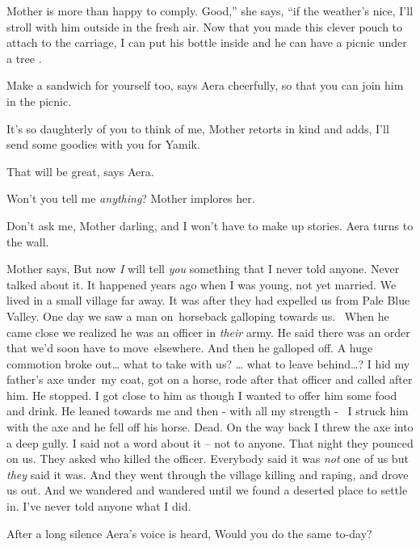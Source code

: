 \documentclass[12pt]{book}
\begin{document}
Mother is more than happy to comply. {\textquotedbl}Good,'' she says, ``if the weather's nice, I'll stroll with him
outside in the fresh air. Now that you made this clever pouch to attach to the carriage, I can put his bottle inside
and he can have a picnic under a tree .{\textquotedbl}

{\textquotedbl}Make a sandwich for yourself too,{\textquotedbl} says Aera cheerfully, {\textquotedbl}so that you can
join him in the picnic.{\textquotedbl}

{\textquotedbl}It's so daughterly of you to think of me,{\textquotedbl} Mother retorts in kind and adds,
{\textquotedbl}I'll send some goodies with you for Yamik.{\textquotedbl}

{\textquotedbl}That will be great,{\textquotedbl} says Aera.

{\textquotedbl}Won't you tell me \textit{anything}?{\textquotedbl} Mother implores her.

{\textquotedbl}Don't ask me, Mother darling, and I won't have to make up stories.{\textquotedbl} Aera turns to the wall.

Mother says, {\textquotedbl}But now \textit{I }will tell \textit{you} something that I never told anyone. Never talked
about it. It happened years ago when I was young, not yet married. We lived in a small village far away. It was after
they had expelled us from Pale Blue Valley. One day we saw a man on~horseback galloping towards us. ~When he came close
we realized he was an officer in \textit{their} army. He said there was an order that we'd soon have to move~elsewhere.
And then he galloped off. A huge commotion broke out{\dots} what to take with us? {\dots} what to leave behind{\dots}?
I hid my father's axe under~my coat, got on a horse, rode after that officer and called after him. He stopped. I got
close to him as though I wanted to offer him some food and drink. He leaned towards me and then - with all my strength
- \ I struck him with the axe and he fell off his horse. Dead. On the way back I threw the axe into a deep gully. I
said not a word about it -- not to anyone. That night they pounced on us. They asked who killed the officer. Everybody
said it was \textit{not} one of us but \textit{they} said it was. And they went through the village killing and raping,
and drove us out. And we wandered and wandered until we found a deserted place to settle in. I've never told anyone
what I did.{\textquotedbl}

After a long silence Aera's voice is heard, {\textquotedbl}Would you do the same to-day?{\textquotedbl}
\end{document}
